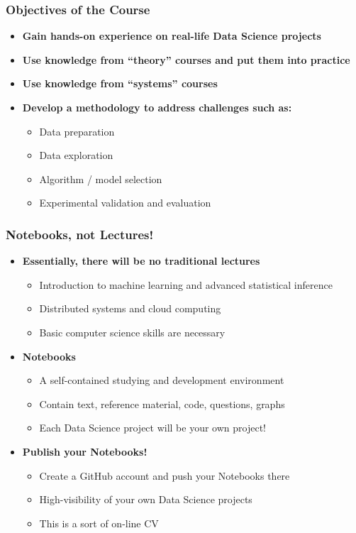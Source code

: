 \begin{frame}\frametitle{Objectives of the Course}
\begin{itemize}
	\item {\bf Gain hands-on experience on real-life Data Science projects}
	\item {\bf Use knowledge from ``theory'' courses and put them into practice}
	\item {\bf Use knowledge from ``systems'' courses} 
	\item {\bf Develop a methodology to address challenges such as:}
	\begin{itemize}
		\item Data preparation
		\item Data exploration
		\item Algorithm / model selection
		\item Experimental validation and evaluation
	\end{itemize}
\end{itemize}
\end{frame}

\begin{frame}\frametitle{Notebooks, not Lectures!}
\begin{itemize}
	\item {\bf Essentially, there will be no traditional lectures}
	\begin{itemize}
		\item Introduction to machine learning and advanced statistical inference
		\item Distributed systems and cloud computing
		\item Basic computer science skills are necessary
	\end{itemize}

	\item {\bf Notebooks}
	\begin{itemize}
		\item A self-contained studying and development environment
		\item Contain text, reference material, code, questions, graphs
		\item Each Data Science project will be your own project!
	\end{itemize}

	\item {\bf Publish your Notebooks!}
	\begin{itemize}
		\item Create a GitHub account and push your Notebooks there
		\item High-visibility of your own Data Science projects
		\item This is a sort of on-line CV
	\end{itemize}
\end{itemize}
\end{frame}


